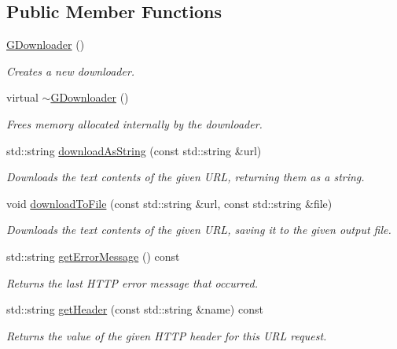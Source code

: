 \subsection*{Public Member Functions}
\begin{DoxyCompactItemize}
\item 
\mbox{\hyperlink{classsgl_1_1GDownloader_a03a6336ad3aebf9d5904c50ce0cdc1dc}{G\+Downloader}} ()
\begin{DoxyCompactList}\small\item\em Creates a new downloader. \end{DoxyCompactList}\item 
virtual \mbox{\hyperlink{classsgl_1_1GDownloader_a6a9f476cb937e98d417d8ab43b8cd8d5}{$\sim$\+G\+Downloader}} ()
\begin{DoxyCompactList}\small\item\em Frees memory allocated internally by the downloader. \end{DoxyCompactList}\item 
std\+::string \mbox{\hyperlink{classsgl_1_1GDownloader_a27b002ce17000e199302c608363c97a2}{download\+As\+String}} (const std\+::string \&url)
\begin{DoxyCompactList}\small\item\em Downloads the text contents of the given U\+RL, returning them as a string. \end{DoxyCompactList}\item 
void \mbox{\hyperlink{classsgl_1_1GDownloader_a0bf57f044cc66c8aab40f3f2179caf21}{download\+To\+File}} (const std\+::string \&url, const std\+::string \&file)
\begin{DoxyCompactList}\small\item\em Downloads the text contents of the given U\+RL, saving it to the given output file. \end{DoxyCompactList}\item 
std\+::string \mbox{\hyperlink{classsgl_1_1GDownloader_adf0cc934eff26878cdf2018259997a4a}{get\+Error\+Message}} () const
\begin{DoxyCompactList}\small\item\em Returns the last H\+T\+TP error message that occurred. \end{DoxyCompactList}\item 
std\+::string \mbox{\hyperlink{classsgl_1_1GDownloader_a736d777b29179f52ba753317d84b1087}{get\+Header}} (const std\+::string \&name) const
\begin{DoxyCompactList}\small\item\em Returns the value of the given H\+T\+TP header for this U\+RL request. \end{DoxyCompactList}\item 

\end{DoxyCompactItemize}
